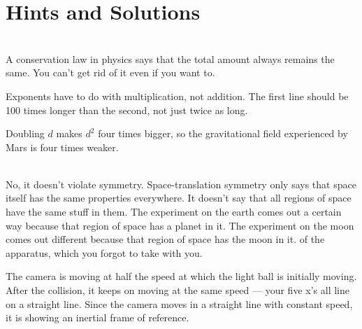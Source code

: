 \label{hwansappendix}%
\appendix\chapter{Hints and Solutions}
	




\noindent{}


\noindent{}\\
 A conservation law in physics says that the total
amount always remains the same. You can't get rid of it even if you want to.

Exponents have to do with multiplication, not addition. The
first line should be 100 times longer than the second,
not just twice as long.

Doubling $d$ makes $d^2$ four times bigger, so the gravitational field experienced
by Mars is four times weaker.


\noindent{}\\
 No, it doesn't violate symmetry. Space-translation symmetry
only says that space itself has the same properties everywhere. It doesn't say that all regions
of space have the same stuff in them. The experiment on the earth comes out a certain way because
that region of space has a planet in it. The experiment on the moon comes out different because
that region of space has the moon in it. of the apparatus, which you forgot to take with you.

 The camera is moving at half the speed at which the light ball is initially
moving. After the collision, it keeps on moving at the same speed --- your five x's all line
on a straight line. Since the camera moves in a straight line with constant speed, it is
showing an inertial frame of reference.

